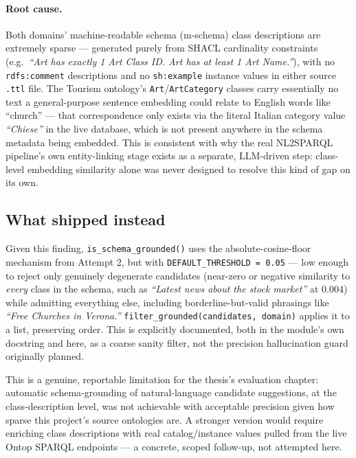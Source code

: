 \documentclass[11pt,a4paper]{article}
\newcommand{\code}[1]{\texttt{#1}}
\begin{document}
\paragraph{Root cause.} Both domains' machine-readable schema (m-schema) class descriptions are
extremely sparse --- generated purely from SHACL cardinality constraints (e.g.\ \emph{``Art has
exactly 1 Art Class ID. Art has at least 1 Art Name.''}), with no \code{rdfs:comment} descriptions
and no \code{sh:example} instance values in either source \code{.ttl} file. The Tourism ontology's
\code{Art}/\code{ArtCategory} classes carry essentially no text a general-purpose sentence
embedding could relate to English words like ``church'' --- that correspondence only exists via
the literal Italian category value \emph{``Chiese''} in the live database, which is not present
anywhere in the schema metadata being embedded. This is consistent with why the real NL2SPARQL
pipeline's own entity-linking stage exists as a separate, LLM-driven step: class-level embedding
similarity alone was never designed to resolve this kind of gap on its own.

\subsection{What shipped instead}

Given this finding, \code{is\_schema\_grounded()} uses the absolute-cosine-floor mechanism from
Attempt 2, but with \code{DEFAULT\_THRESHOLD = 0.05} --- low enough to reject only genuinely
degenerate candidates (near-zero or negative similarity to \emph{every} class in the schema, such
as \emph{``Latest news about the stock market''} at $0.004$) while admitting everything else,
including borderline-but-valid phrasings like \emph{``Free Churches in Verona.''}
\code{filter\_grounded(candidates, domain)} applies it to a list, preserving order. This is
explicitly documented, both in the module's own docstring and here, as a coarse sanity filter, not
the precision hallucination guard originally planned.

This is a genuine, reportable limitation for the thesis's evaluation chapter: automatic
schema-grounding of natural-language candidate suggestions, at the class-description level, was
not achievable with acceptable precision given how sparse this project's source ontologies are. A
stronger version would require enriching class descriptions with real catalog/instance values
pulled from the live Ontop SPARQL endpoints --- a concrete, scoped follow-up, not attempted here.
\end{document}
